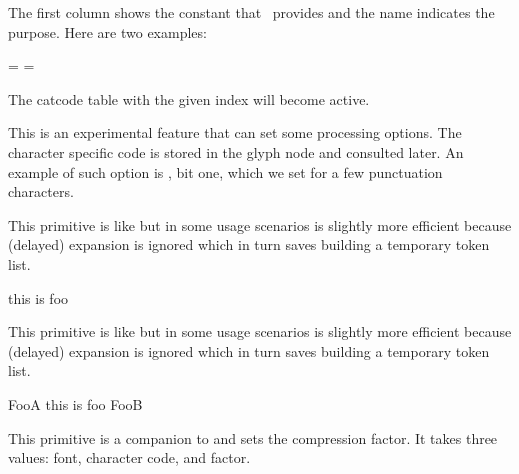 The first column shows the constant that \CONTEXT\ provides and the
name indicates the purpose. Here are two examples:

\starttyping
{}=\begingroupcatcode
{}=\endgroupcatcode
\stoptyping

\stopoldprimitive

\startnewprimitive[title={\prm {catcodetable}}]

The catcode table with the given index will become active.

\stopnewprimitive

\startnewprimitive[title={\prm {cccode}}]

This is an experimental feature that can set some processing options. The
character specific code is stored in the glyph node and consulted later. An
example of such option is , bit one, which we set for a few
punctuation characters.

\stopnewprimitive

\startnewprimitive[title={\prm {cdef}}]

This primitive is like  but in some usage scenarios is slightly
more efficient because (delayed) expansion is ignored which in turn saves
building a temporary token list.

\startbuffer
\edef\FooA{this is foo} \meaningfull\FooA\crlf
\cdef{} \meaningfull\FooB\par
\stopbuffer

\typebuffer {\tttf \getbuffer}

\stopnewprimitive

\startnewprimitive[title={\prm {cdefcsname}}]

This primitive is like  but in some usage scenarios is slightly
more efficient because (delayed) expansion is ignored which in turn saves
building a temporary token list.

\startbuffer
\edefcsname FooA \meaningasis\FooA\crlf
\cdefcsname FooB \meaningasis\FooB\par
\stopbuffer

\typebuffer {\tttf \getbuffer}

\stopnewprimitive

\startnewprimitive[title={\prm {cfcode}}]

This primitive is a companion to  and sets the compression factor.
It takes three values: font, character code, and factor.

